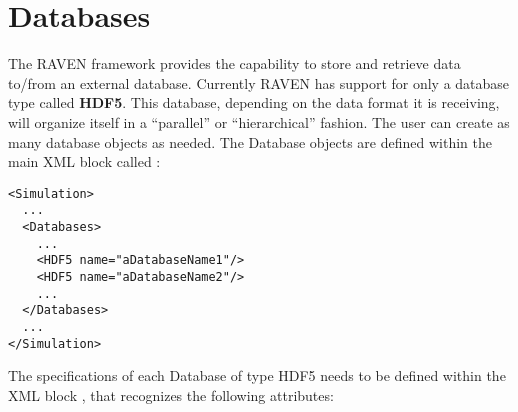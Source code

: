 \section{Databases}
\label{sec:Databases}
The RAVEN framework provides the capability to store and retrieve data to/from
an external database.
%
Currently RAVEN has support for only a database type called \textbf{HDF5}.
%
This database, depending on the data format it is receiving, will organize
itself in a ``parallel'' or ``hierarchical'' fashion.
%
The user can create as many database objects as needed.
%
The Database objects are defined within the main XML block called
:
\begin{lstlisting}[style=XML]
<Simulation>
  ...
  <Databases>
    ...
    <HDF5 name="aDatabaseName1"/>
    <HDF5 name="aDatabaseName2"/>
    ...
  </Databases>
  ...
</Simulation>
\end{lstlisting}
The specifications of each Database of type HDF5 needs to be defined within the
XML block , that recognizes the following attributes:
\vspace{-5mm}
